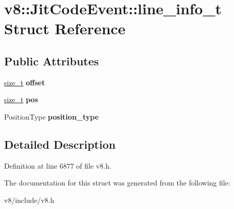 \hypertarget{structv8_1_1JitCodeEvent_1_1line__info__t}{}\section{v8\+:\+:Jit\+Code\+Event\+:\+:line\+\_\+info\+\_\+t Struct Reference}
\label{structv8_1_1JitCodeEvent_1_1line__info__t}
\subsection*{Public Attributes}
\begin{DoxyCompactItemize}
\item 
\mbox{\label{structv8_1_1JitCodeEvent_1_1line__info__t_a084f165114adc594e838ef5fe0c879d6}} 
\mbox{\hyperlink{classsize__t}{size\+\_\+t}} {\bfseries offset}
\item 
\mbox{\label{structv8_1_1JitCodeEvent_1_1line__info__t_aad9a3d593ffa9b647b31b67f60ad19f2}} 
\mbox{\hyperlink{classsize__t}{size\+\_\+t}} {\bfseries pos}
\item 
\mbox{\label{structv8_1_1JitCodeEvent_1_1line__info__t_ad8a0e551ed2b67096a3fe2f64e2b77a2}} 
Position\+Type {\bfseries position\+\_\+type}
\end{DoxyCompactItemize}


\subsection{Detailed Description}


Definition at line 6877 of file v8.\+h.



The documentation for this struct was generated from the following file\+:\begin{DoxyCompactItemize}
\item 
v8/include/v8.\+h\end{DoxyCompactItemize}
